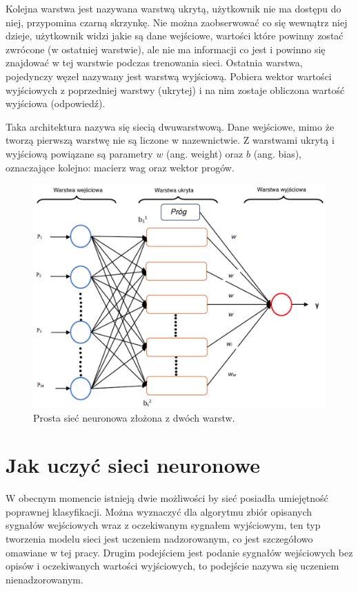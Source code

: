 \documentclass[12pt,a4paper,twoside,titlepage,openright]{book}
\begin{document}
Kolejna warstwa jest nazywana warstwą ukrytą, użytkownik nie ma dostępu do niej, przypomina czarną skrzynkę. Nie można zaobserwować co się wewnątrz niej dzieje, użytkownik widzi jakie są dane wejściowe, wartości które powinny zostać zwrócone (w ostatniej warstwie), ale nie ma informacji co jest i powinno się znajdować w tej warstwie podczas trenowania sieci.
Ostatnia warstwa, pojedynczy węzeł nazywany jest warstwą wyjściową. Pobiera wektor wartości wyjściowych z poprzedniej warstwy (ukrytej) i na nim zostaje obliczona wartość wyjściowa (odpowiedź).

Taka architektura nazywa się siecią dwuwarstwową. Dane wejściowe, mimo że tworzą pierwszą warstwę nie są liczone w nazewnictwie.
Z warstwami ukrytą i wyjściową powiązane są parametry \(w\) (ang. weight) oraz \(b\) (ang. bias), oznaczające kolejno: macierz wag oraz wektor progów.

\begin{figure}[h]
	\centering
			\includegraphics[resolution=100, scale=0.2]{SiecNeuronowa.png}
		\caption{Prosta sieć neuronowa złożona z dwóch warstw.}
\end{figure}

\section{Jak uczyć sieci neuronowe}
W obecnym momencie istnieją dwie możliwości by sieć posiadła umiejętność poprawnej klasyfikacji. Można wyznaczyć dla algorytmu zbiór opisanych sygnałów wejściowych wraz z oczekiwanym sygnałem wyjściowym, ten typ tworzenia modelu sieci jest uczeniem nadzorowanym, co jest szczegółowo omawiane w tej pracy. Drugim podejściem jest podanie sygnałów wejściowych bez opisów i oczekiwanych wartości wyjściowych, to podejście nazywa się uczeniem nienadzorowanym.
\end{document}
